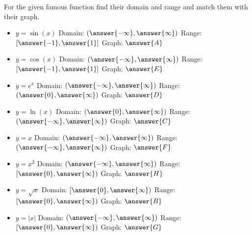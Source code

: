\documentclass{ximera}
\author{Nela Lakos \and Kyle Parsons}
\begin{document}
\begin{exercise}

For the given famous function find their domain and range and match them with their graph.

\begin{itemize}
\item $y=\sin\left(x\right)$ Domain: $\left(\answer{-\infty},\answer{\infty}\right)$ Range: $\left[\answer{-1},\answer{1}\right]$ Graph: $\answer{A}$
\item $y=\cos\left(x\right)$ Domain: $\left(\answer{-\infty},\answer{\infty}\right)$ Range: $\left[\answer{-1},\answer{1}\right]$ Graph: $\answer{E}$
\item $y=e^x$ Domain: $\left(\answer{-\infty},\answer{\infty}\right)$ Range: $\left(\answer{0},\answer{\infty}\right)$ Graph: $\answer{D}$
\item $y=\ln\left(x\right)$ Domain: $\left(\answer{0},\answer{\infty}\right)$ Range: $\left(\answer{-\infty},\answer{\infty}\right)$ Graph: $\answer{C}$
\item $y=x$ Domain: $\left(\answer{-\infty},\answer{\infty}\right)$ Range: $\left(\answer{-\infty},\answer{\infty}\right)$ Graph: $\answer{F}$
\item $y=x^2$ Domain: $\left(\answer{-\infty},\answer{\infty}\right)$ Range: $\left[\answer{0},\answer{\infty}\right)$ Graph: $\answer{H}$
\item $y=\sqrt{x}$ Domain: $\left[\answer{0},\answer{\infty}\right)$ Range: $\left[\answer{0},\answer{\infty}\right)$ Graph: $\answer{B}$
\item $y=\left|x\right|$ Domain: $\left(\answer{-\infty},\answer{\infty}\right)$ Range: $\left[\answer{0},\answer{\infty}\right)$ Graph: $\answer{G}$
\end{itemize}

\begin{image}
\end{image}


\end{exercise}
\end{document}
